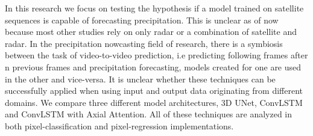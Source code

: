 In this research we focus on testing the hypothesis if a model trained on satellite sequences is capable of forecasting precipitation.
This is unclear as of now because most other studies rely on only radar or a combination of satellite and radar.
In the precipitation nowcasting field of research, there is a symbiosis between the task of video-to-video prediction, i.e predicting following frames after n previous frames and precipitation forecasting, models created for one are used in the other and vice-versa.
It is unclear whether these techniques can be successfully applied when using input and output data originating from different domains. We compare three different model architectures, 3D UNet, ConvLSTM and ConvLSTM with Axial Attention. All of these techniques are analyzed in both pixel-classification and pixel-regression implementations.
